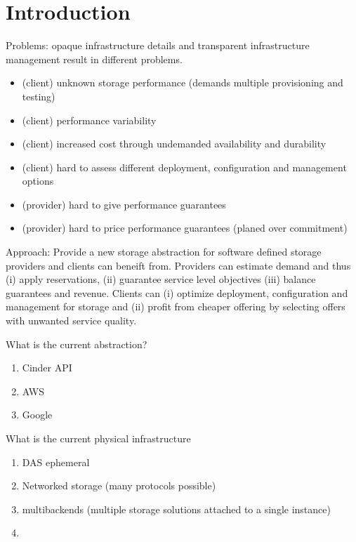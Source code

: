 \section{Introduction}
Problems: opaque infrastructure details and transparent infrastructure management result in different problems.
\begin{itemize}
\item (client) unknown storage performance \cite{Kossmann2010, Schad2010} (demands multiple provisioning and testing)
\item (client) performance variability \cite{Kossmann2010, Schad2010}
\item (client) increased cost through undemanded availability and durability 
\item (client) hard to assess different deployment, configuration and management options 
\item (provider) hard to give performance guarantees 
\item (provider) hard to price performance guarantees (planed over commitment)
\end{itemize}

Approach: Provide a new storage abstraction for software defined storage providers and clients can beneift from. Providers can estimate demand and thus (i) apply reservations, (ii) guarantee service level objectives (iii) balance guarantees and revenue. Clients can (i) optimize deployment, configuration and management for storage and (ii) profit from cheaper offering by selecting offers with unwanted service quality.

What is the current abstraction? 
\begin{enumerate}
	\item Cinder API
	\item AWS
	\item Google
\end{enumerate}

What is the current physical infrastructure
\begin{enumerate}
	\item DAS ephemeral
	\item Networked storage (many protocols possible)
	\item multibackends (multiple storage solutions attached to a single instance)
	\item 
\end{enumerate}

